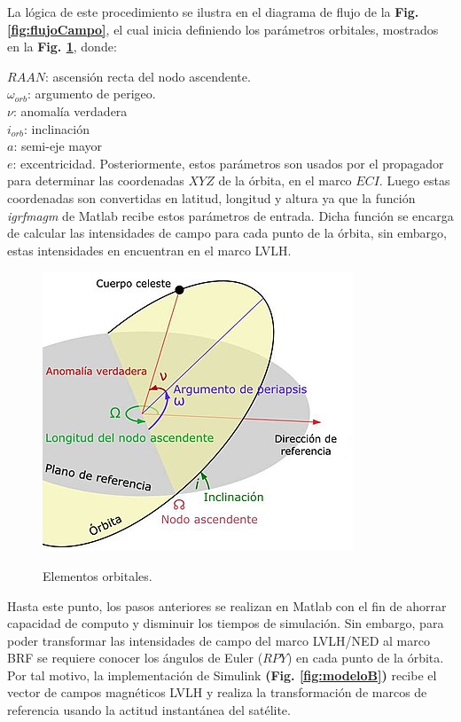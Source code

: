 	 
La lógica de este procedimiento se ilustra en el diagrama de flujo de la \textbf{Fig. \ref{fig:flujoCampo}}, el cual inicia definiendo los parámetros orbitales, mostrados en la \textbf{Fig. \ref{fig:elementosOrbitales}}, donde:

\noindent$RAAN$: ascensión recta del nodo ascendente.  \\
$\omega_{orb}$: argumento de perigeo. \\
$\nu$: anomalía verdadera\\
$i_{orb}$: inclinación \\
$a$: semi-eje mayor \\
$e$: excentricidad.
\newpage
Posteriormente, estos parámetros son usados por el propagador para determinar las coordenadas $XYZ$ de la órbita, en el marco $ECI$. Luego estas coordenadas son convertidas en latitud, longitud y altura ya que la función \textit{igrfmagm} de Matlab recibe estos parámetros de entrada. Dicha función se encarga de calcular las intensidades de campo para cada punto de la órbita, sin embargo, estas intensidades en encuentran en el marco LVLH.
\begin{figure}[!ht]
	\begin{center}
		\includegraphics[scale=0.6]{imagenes/modelo_dinamico/Elementos_orbitales.jpg}\\
	\end{center}
	\caption{Elementos orbitales.}
	\label{fig:elementosOrbitales}
	\textit{}
\end{figure}

Hasta este punto, los pasos anteriores se realizan en Matlab con el fin de ahorrar capacidad de computo y disminuir los tiempos de simulación. Sin embargo, para poder transformar las intensidades de campo del marco LVLH/NED al marco BRF se requiere conocer los ángulos de Euler ($RPY$) en cada punto de la órbita. Por tal motivo, la implementación de Simulink  \textbf{(Fig. \ref{fig:modeloB})}  recibe el vector de campos magnéticos LVLH y realiza la transformación de marcos de referencia usando la actitud instantánea del satélite.

